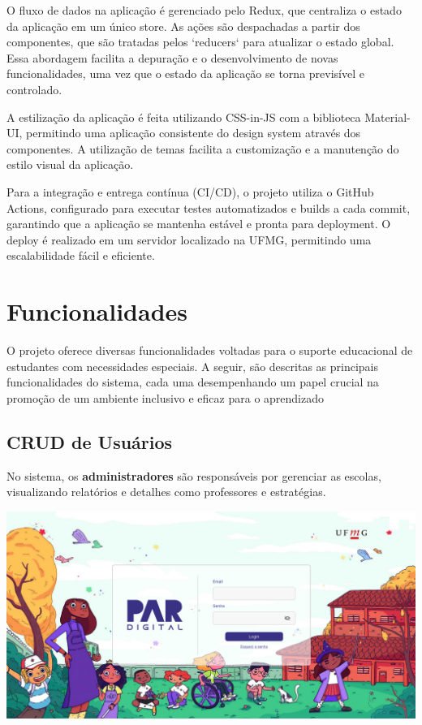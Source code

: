 \documentclass[sigconf]{webmedia}
\begin{document}
O fluxo de dados na aplicação é gerenciado pelo Redux, que centraliza o estado da
aplicação em um único store. As ações são despachadas a partir dos componentes,
que são tratadas pelos `reducers` para atualizar o estado global. Essa abordagem
facilita a depuração e o desenvolvimento de novas funcionalidades, uma vez que o
estado da aplicação se torna previsível e controlado.

A estilização da aplicação é feita utilizando CSS-in-JS com a biblioteca Material-UI,
 permitindo uma aplicação consistente do design system através dos componentes.
 A utilização de temas facilita a customização e a manutenção do estilo visual da
 aplicação.

Para a integração e entrega contínua (CI/CD), o projeto utiliza
o GitHub Actions, configurado para executar testes automatizados e builds a cada
commit, garantindo que a aplicação se mantenha estável e pronta para deployment.
O deploy é realizado em um servidor localizado na UFMG, permitindo uma escalabilidade
 fácil e eficiente.



\section{Funcionalidades}

O projeto oferece diversas funcionalidades voltadas para o suporte
educacional de estudantes com necessidades especiais. A seguir, são
descritas as principais funcionalidades do sistema, cada uma desempenhando
 um papel crucial na promoção de um ambiente inclusivo e eficaz para o
 aprendizado

\subsection{CRUD de Usuários}
No sistema, os {\bfseries administradores} são responsáveis por gerenciar as
escolas, visualizando relatórios e detalhes como professores e
estratégias.

\includegraphics[scale=0.12]{./imgs/capa}
\end{document}
